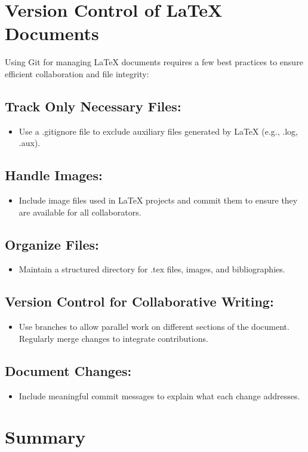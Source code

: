 \documentclass{article}
\begin{document}
\section{Version Control of LaTeX Documents}
Using Git for managing LaTeX documents requires a few best practices to ensure efficient collaboration and file integrity:
\subsection{Track Only Necessary Files:}
\begin{itemize}
    \item Use a .gitignore file to exclude auxiliary files generated by LaTeX (e.g., .log, .aux).
\end{itemize}
\subsection{Handle Images:}
\begin{itemize}
    \item 
Include image files used in LaTeX projects and commit them to ensure they are available for all collaborators.
\end{itemize}
\subsection{Organize Files:}
\begin{itemize}
    \item Maintain a structured directory for .tex files, images, and bibliographies.
\end{itemize}
\subsection{Version Control for Collaborative Writing:}
\begin{itemize}
    \item 
Use branches to allow parallel work on different sections of the document.
Regularly merge changes to integrate contributions.
\end{itemize}
\subsection{Document Changes:}
\begin{itemize}
    \item Include meaningful commit messages to explain what each change addresses.
\end{itemize}



\section{Summary}
\end{document}

